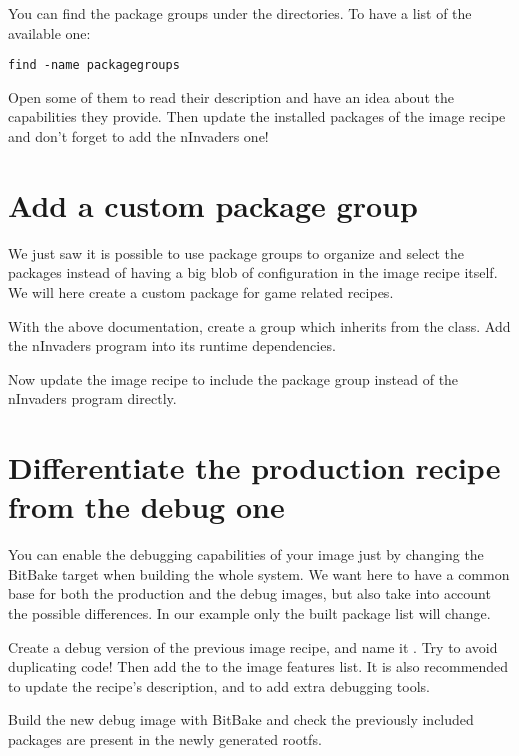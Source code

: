 You can find the package groups under the  directories. To
have a list of the available one:
\begin{verbatim}
find -name packagegroups
\end{verbatim}

Open some of them to read their description and have an idea about the
capabilities they provide. Then update the installed packages of the image
recipe and don't forget to add the nInvaders one!

\section{Add a custom package group}

We just saw it is possible to use package groups to organize and select the
packages instead of having a big blob of configuration in the image recipe
itself. We will here create a custom package for game related recipes.

With the above documentation, create a  group
which inherits from the  class. Add the nInvaders program
into its runtime dependencies.

Now update the image recipe to include the package group instead of the
nInvaders program directly.

\section{Differentiate the production recipe from the debug one}

You can enable the debugging capabilities of your image just by changing the
BitBake target when building the whole system. We want here to have a common
base for both the production and the debug images, but also take into account the
possible differences. In our example only the built package list will change.

Create a debug version of the previous image recipe, and name it
. Try to avoid duplicating code! Then add the
 to the image features list. It is also recommended to
update the recipe's description, and to add extra debugging tools.

Build the new debug image with BitBake and check the previously
included packages are present in the newly generated rootfs.
